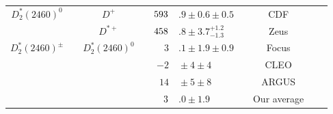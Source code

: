 {\begin{tabular}{cp{5pt}cp{5pt}r@{}lp{5pt}cp{5pt}c}
		\multirow{2}{*}{$D_{2}^{*}(2460)^{0}$}          &   & $D^{+}$                                      & \cellcolor{LightGray} & $	\cellcolor{LightGray}593$  & \cellcolor{LightGray}$.9\pm0.6\pm0.5	$         & \cellcolor{LightGray} & \cellcolor{LightGray}CDF      & \cellcolor{LightGray} & \cite{Abulencia:2005ry} \\  \cmidrule{3-9}
		                                                &   & $D^{*+}$                                     & \cellcolor{LightGray} & $	\cellcolor{LightGray} 458$ & \cellcolor{LightGray}$.8\pm3.7^{+1.2}_{-1.3}	$ & \cellcolor{LightGray} & \cellcolor{LightGray} Zeus    & \cellcolor{LightGray} & \cite{Chekanov:2008ac}  \\ \midrule
		\multirow{4}{*}[-2pt]{$D_{2}^{*}(2460)^{\pm}$}  &   & \multirow{4}{*}[-2pt]{$D_{2}^{*}(2460)^{0}$} &                       & $	3$                         & $.1\pm1.9\pm0.9	$                              &                       & Focus                         &                       & \cite{Link:2003bd}      \\
		                                                &   &                                              &                       & $-2$                         & ${}\pm4\pm4	$                                  &                       & CLEO                          &                       & \cite{Bergfeld:1994af}  \\
		                                                &   &                                              &                       & $	14$                        & ${}\pm5\pm8	$                                  &                       & ARGUS                         &                       & \cite{Albrecht:1989gb}  \\ \cmidrule{4-9}
		                                                &   &                                              & \cellcolor{Gray}      & $	\cellcolor{Gray}  3$       & \cellcolor{Gray}$.0 \pm 1.9	$                  & \cellcolor{Gray}      & \cellcolor{Gray} Our average  & \cellcolor{Gray}      &                         \\ \midrule
													

\end{tabular}}
